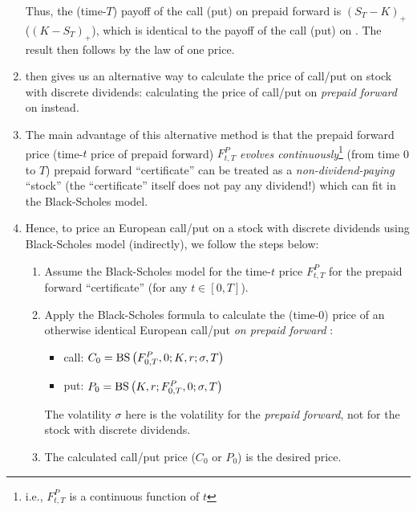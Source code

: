\begin{enumerate}
\begin{pf}
Thus, the (time-\(T\)) payoff of the call (put) on prepaid forward is
\((S_T-K)_{+}\) (\((K-S_T)_{+}\)), which is identical to the payoff of the call
(put) on . The result then follows by the law of one price.
\end{pf}
\item {} then gives us an alternative way to
calculate the price of call/put on stock  with discrete
dividends: calculating the price of call/put on \emph{prepaid forward} on
 instead.

\item The main advantage of this alternative method is that the prepaid forward
price (time-\(t\) price of prepaid forward) \(F_{t,T}^{P}\) \emph{evolves
continuously}\footnote{i.e., \(F_{t,T}^{P}\) is a continuous function of \(t\)}
(from time 0 to \(T\))  prepaid forward ``certificate''
 can be treated as a \emph{non-dividend-paying} ``stock'' (the
``certificate''  itself does not pay any dividend!) which can
fit in the Black-Scholes model.

\item \label{it:price-euro-call-put-on-stock-disc-div}
Hence, to price an European call/put on a stock  with
discrete dividends using Black-Scholes model (indirectly), we follow the steps
below:
\begin{enumerate}
\item Assume the Black-Scholes model for the time-\(t\) price \(F_{t,T}^{P}\)
for the prepaid forward ``certificate''  (for any \(t\in[0,T]\)).
\item Apply the Black-Scholes formula to calculate the (time-0) price of an
otherwise identical European call/put \emph{on prepaid forward}
:
\begin{itemize}
\item call: \(C_0=\operatorname{BS}\qty(F_{0,T}^{P},0;K,r;\sigma,T)\)
\item put: \(P_0=\operatorname{BS}\qty(K,r;F_{0,T}^{P},0;\sigma,T)\)
\end{itemize}
\begin{note}
The volatility \(\sigma\) here is the volatility for the \emph{prepaid
forward}, not for the stock  with discrete dividends.
\end{note}
\item The calculated call/put price (\(C_0\) or \(P_0\)) is the desired price.
\end{enumerate}
\end{enumerate}

